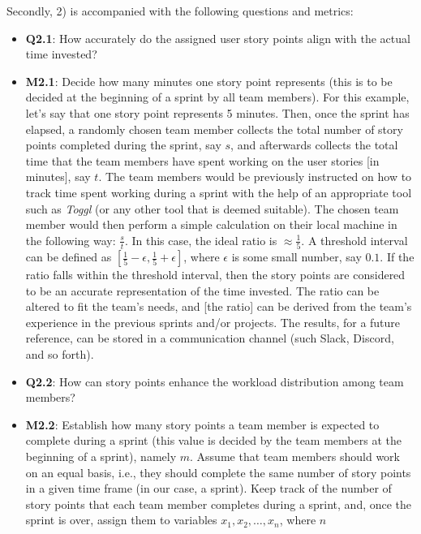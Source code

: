 \documentclass[conference]{IEEEtran}
\begin{document}
Secondly, 2) is accompanied with the following questions and metrics:

\begin{itemize}
  \item \textbf{Q2.1}: How accurately do the assigned user story points align
    with the actual time invested?
  \item \textbf{M2.1}:
    Decide how many minutes one story point represents (this is to be decided
    at the beginning of a sprint by all team members). For this example, let's
    say that one story point represents 5 minutes. Then, once the sprint has
    elapsed, a randomly chosen team member collects the total number of story
    points completed during the sprint, say $s$, and afterwards collects the
    total time that the team members have spent working on the user stories [in
    minutes], say $t$. The team members would be previously instructed on how
    to track time spent working during a sprint with the help of an appropriate
    tool such as \textit{Toggl} (or any other tool that is deemed suitable).
    The chosen team member would then perform a simple calculation on their
    local machine in the following way: $\frac{s}{t}$. In this case, the ideal
    ratio is $\approx \frac{1}{5}$. A threshold interval can be defined as
    $[\frac{1}{5} - \epsilon, \frac{1}{5} + \epsilon]$, where $\epsilon$ is
    some small number, say $0.1$. If the ratio falls within the threshold
    interval, then the story points are considered to be an accurate
    representation of the time invested. The ratio can be altered to fit the
    team's needs, and [the ratio] can be derived from the team's experience in
    the previous sprints and/or projects. The results, for a future reference,
    can be stored in a communication channel (such Slack, Discord, and so
    forth).
  \item \textbf{Q2.2}: How can story points enhance the workload distribution
    among team members?
  \item \textbf{M2.2}: 
    Establish how many story points a team member is expected to complete
    during a sprint (this value is decided by the team members at the beginning
    of a sprint), namely $m$. Assume that team members should work on an equal
    basis, i.e., they should complete the same number of story points in a
    given time frame (in our case, a sprint). Keep track of the number of story
    points that each team member completes during a sprint, and, once the
    sprint is over, assign them to variables $x_1, x_2, \dots, x_n$, where $n$

\end{itemize}
\end{document}
